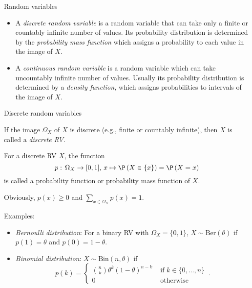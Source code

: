 \documentclass[11pt,compress,t,notes=noshow, xcolor=table]{beamer}
\begin{document}
\begin{vbframe}{Random variables}
\begin{itemize}
 	\item A \emph{discrete random variable} is a random variable that can take only a finite or countably
 	infinite number of values. Its probability distribution is determined by the \emph{probability mass function}  which assigns a probability to each value in the image of $X.$
 	\item A \emph{continuous random variable} is a random variable which can take uncountably
 	infinite number of values. Usually its probability distribution is determined by a \emph{density function,} which assigns probabilities to intervals of the image of $X.$
 \end{itemize}


\end{vbframe}



\begin{vbframe}{Discrete random variables} 

If the image $\Omega_X$ of $X$ is discrete (e.g., finite or countably infinite), then $X$ is called a \emph{discrete RV}.
 
 \lz
 
 For a discrete RV $X$, the function 
 $$p:\, \Omega_X \to [0,1], \,  x \mapsto  \P \left(X \in \{x\} \right) = \P \left(X = x \right)
 $$ 
 is called a probability function or probability mass function of $X$. 
 
 
 \lz 
 
 Obviously, $p(x) \geq 0$ and $\sum_{x \in \Omega_X} p(x) = 1$.
% 
 
	Examples:
	\begin{itemize}
		\item \emph{Bernoulli distribution}: For a binary RV with $\Omega_X = \{0,1\}$, $X \sim \mathrm{Ber}(\theta)$ if $p(1) = \theta$ and $p(0)= 1 - \theta$.
		\item \emph{Binomial distribution}: $X \sim \mathrm{Bin}(n,\theta)$ if $$
p(k) = \left\{ \begin{array}{cl}
	{n \choose k} \theta^k (1-\theta)^{n-k} & \text{ if } k \in \{0, \ldots , n\}\\
	0 & \text{ otherwise}
\end{array} \right. \, .
$$
	\end{itemize}
 


\end{vbframe}
\end{document}
